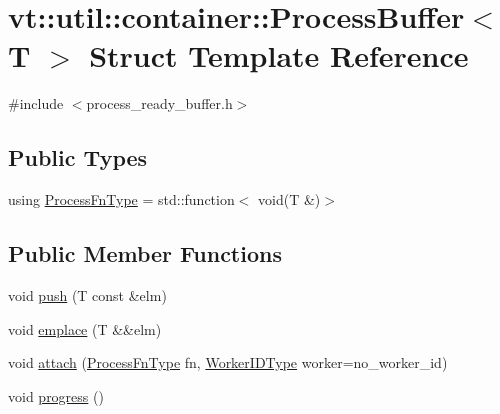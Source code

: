 \hypertarget{structvt_1_1util_1_1container_1_1_process_buffer}{}\section{vt\+:\+:util\+:\+:container\+:\+:Process\+Buffer$<$ T $>$ Struct Template Reference}
\label{structvt_1_1util_1_1container_1_1_process_buffer}


{\ttfamily \#include $<$process\+\_\+ready\+\_\+buffer.\+h$>$}

\subsection*{Public Types}
\begin{DoxyCompactItemize}
\item 
using \hyperlink{structvt_1_1util_1_1container_1_1_process_buffer_a20be3480fb453096015a6fe5ca370816}{Process\+Fn\+Type} = std\+::function$<$ void(T \&)$>$
\end{DoxyCompactItemize}
\subsection*{Public Member Functions}
\begin{DoxyCompactItemize}
\item 
void \hyperlink{structvt_1_1util_1_1container_1_1_process_buffer_a1fab9ef25e64fdab844f3e3d40699ad9}{push} (T const \&elm)
\item 
void \hyperlink{structvt_1_1util_1_1container_1_1_process_buffer_ae1bff94f45b85fa126a63b98c6c2e869}{emplace} (T \&\&elm)
\item 
void \hyperlink{structvt_1_1util_1_1container_1_1_process_buffer_ab8b25ce1820da72a1770778252dabfea}{attach} (\hyperlink{structvt_1_1util_1_1container_1_1_process_buffer_a20be3480fb453096015a6fe5ca370816}{Process\+Fn\+Type} fn, \hyperlink{namespacevt_a656e362091da17b9b93d0655b36e3392}{Worker\+I\+D\+Type} worker=no\+\_\+worker\+\_\+id)
\item 
void \hyperlink{structvt_1_1util_1_1container_1_1_process_buffer_aab87efa377b2b94320ba7c83b568b227}{progress} ()
\end{DoxyCompactItemize}
